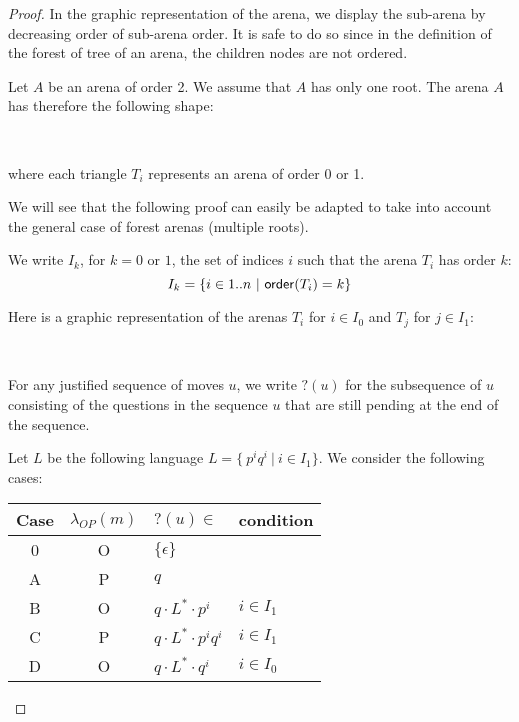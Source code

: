 \begin{proof}
In the graphic representation of the arena, we display the sub-arena by decreasing order of sub-arena order.
It is safe to do so since in the definition of the forest of tree of an arena, the children nodes
are not ordered.

Let $A$ be an arena of order 2. We assume that $A$ has only one root. The arena $A$ has therefore the following shape:
\begin{center}
\
    {
 \SubTree[linestyle=none]{$\ldots$} 
    \TR{$a_1$} \TR{$a_2$} \TR{\ldots} }
\end{center}

where each triangle $T_i$ represents an arena of order 0 or 1.

We will see that the following proof can easily be adapted to take into account the general case of forest arenas (multiple roots).

We write $I_k$, for $k=0$ or $1$, the set of indices $i$ such that the arena $T_i$ has order $k$:
$$I_k = \{ i \in 1.. n\ |\ {\sf order}(T_i) = k \}$$

Here is a graphic representation of the arenas $T_i$ for $i \in I_0$ and $T_j$ for $j \in I_1$:
\begin{center}
\
    {   \TR{\ldots} }
\hspace{2cm}
    {
        {   \TR{\ldots} }
      \TR{$b_1^j$}  \TR{\ldots}
    }
\end{center}



For any justified sequence of moves $u$, we write $?(u)$ for the
subsequence of $u$ consisting of the questions in the sequence $u$
that are still pending at the end of the sequence.

Let $L$ be the following language $L = \{\ p^i q^i\ | \ i \in I_1
\}$. We consider the following cases:

\begin{center}
\begin{tabular}{c|c|l|l}
Case & $\lambda_{OP}(m)$ & $?(u) \in$ & condition \\ \hline
0 & O & $\{ \epsilon \}$ \\
A & P & $q$ \\
B & O & $q \cdot L^* \cdot p^i$     & $i \in I_1$ \\
C & P & $q \cdot L^* \cdot p^i q^i$ & $i \in I_1$ \\
D & O & $q \cdot L^* \cdot q^i$      & $i \in I_0$ \\
\end{tabular}
\end{center}


\end{proof}
